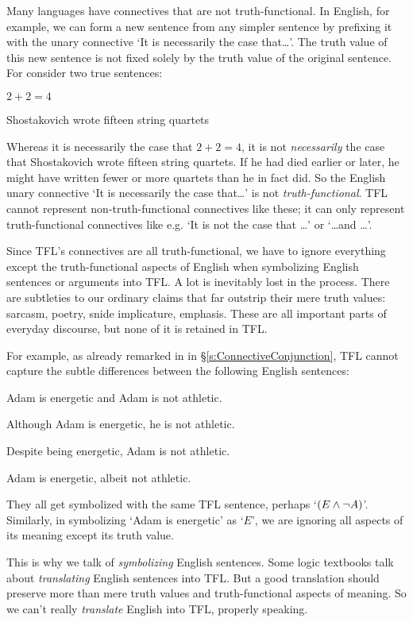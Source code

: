 Many languages have connectives that are not truth-functional. In English, for example, we can form a new sentence from any simpler sentence by prefixing it with the unary connective `It is necessarily the case that\ldots'. The truth value of this new sentence is not fixed solely by the truth value of the original sentence. For consider two true sentences:
	\begin{earg}
		\item $2 + 2 = 4$
		\item Shostakovich wrote fifteen string quartets
	\end{earg}
Whereas it is necessarily the case that $2 + 2 = 4$, it is not \emph{necessarily} the case that Shostakovich wrote fifteen string quartets. If he had died earlier or later, he might have written fewer or more quartets than he in fact did. So the English unary connective `It is necessarily the case that\ldots' is not \emph{truth-functional}.  TFL cannot represent non-truth-functional connectives like these; it can only represent truth-functional connectives like e.g. `It is not the case that \ldots' or `\ldots and \ldots'.


Since TFL's connectives are all truth-functional, we have to ignore everything except the truth-functional aspects of English when symbolizing English sentences or arguments into TFL.  A lot is inevitably lost in the process.  There are subtleties to our ordinary claims that far outstrip their mere truth values: sarcasm, poetry, snide implicature, emphasis.  These are all important parts of everyday discourse, but none of it is retained in TFL.

For example, as already remarked in in \S\ref{s:ConnectiveConjunction}, TFL cannot capture the subtle differences between the following English sentences:
	\begin{earg}
		\item Adam is energetic and Adam is not athletic.
		\item Although Adam is energetic, he is not athletic.
		\item Despite being energetic, Adam is not athletic.
		\item Adam is energetic, albeit not athletic.
	\end{earg}
They all get symbolized with the same TFL sentence, perhaps `$(E \wedge \neg A)$'.  Similarly, in symbolizing `Adam is energetic' as `$E$', we are ignoring all aspects of its meaning except its truth value.

This is why we talk of \emph{symbolizing} English sentences. Some logic textbooks talk about \emph{translating} English sentences into TFL. But a good translation should preserve more than mere truth values and truth-functional aspects of meaning.  So we can't really \emph{translate} English into TFL, properly speaking.

